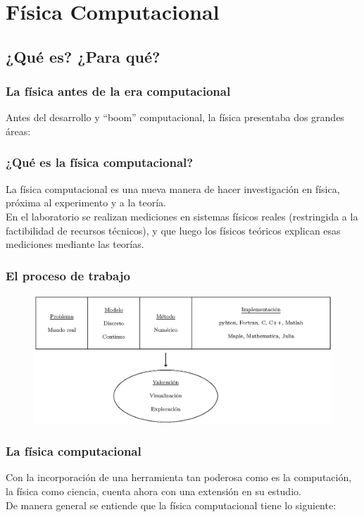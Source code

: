\section{Física Computacional}
\subsection{¿Qué es? ¿Para qué?}
\begin{frame}
\frametitle{La física antes de la era computacional}
Antes del desarrollo y \enquote{boom} computacional, la física presentaba dos grandes áreas:
\begin{figure}
	\centering
	
	\end{figure}
\end{frame}
\begin{frame}
\frametitle{¿Qué es la física computacional?}
La física computacional es una nueva manera de hacer investigación en física, próxima al
experimento y a la teoría.
\\
\medskip
En el laboratorio se realizan mediciones en sistemas físicos reales (restringida a la factibilidad de recursos técnicos), y que luego los físicos teóricos explican esas mediciones mediante las teorías.
\end{frame}
\begin{frame}[fragile]
\frametitle{El proceso de trabajo}
\begin{figure}
	\centering
	\hspace*{-1cm}
	\includegraphics[scale=0.7]{Imagenes/figura_03.eps}
\end{figure}
\end{frame}
\begin{frame}[fragile]
\begin{figure}
	\centering
	
\end{figure}
\end{frame}
\begin{frame}[fragile]
\frametitle{La física computacional}
Con la incorporación de una herramienta tan poderosa como es la computación, la física como ciencia, cuenta ahora con una extensión en su estudio.
\\
\bigskip
\pause
De manera general se entiende que la física computacional tiene lo siguiente:
\end{frame}
